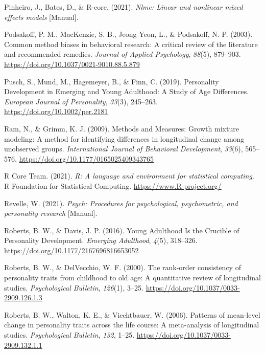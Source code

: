 \documentclass[
  english,
  man,floatsintext]{apa7}
\begin{document}
\leavevmode\hypertarget{ref-R-nlme}{}%
Pinheiro, J., Bates, D., \& R-core. (2021). \emph{Nlme: Linear and nonlinear mixed effects models} {[}Manual{]}.

\leavevmode\hypertarget{ref-podsakoffCommonMethodBiases2003}{}%
Podsakoff, P. M., MacKenzie, S. B., Jeong-Yeon, L., \& Podsakoff, N. P. (2003). Common method biases in behavioral research: A critical review of the literature and recommended remedies. \emph{Journal of Applied Psychology}, \emph{88}(5), 879--903. \url{https://doi.org/10.1037/0021-9010.88.5.879}

\leavevmode\hypertarget{ref-puschPersonalityDevelopmentEmerging2019}{}%
Pusch, S., Mund, M., Hagemeyer, B., \& Finn, C. (2019). Personality Development in Emerging and Young Adulthood: A Study of Age Differences. \emph{European Journal of Personality}, \emph{33}(3), 245--263. \url{https://doi.org/10.1002/per.2181}

\leavevmode\hypertarget{ref-ramMethodsMeasuresGrowth2009}{}%
Ram, N., \& Grimm, K. J. (2009). Methods and Measures: Growth mixture modeling: A method for identifying differences in longitudinal change among unobserved groups. \emph{International Journal of Behavioral Development}, \emph{33}(6), 565--576. \url{https://doi.org/10.1177/0165025409343765}

\leavevmode\hypertarget{ref-R-base}{}%
R Core Team. (2021). \emph{R: A language and environment for statistical computing}. R Foundation for Statistical Computing. \url{https://www.R-project.org/}

\leavevmode\hypertarget{ref-R-psych}{}%
Revelle, W. (2021). \emph{Psych: Procedures for psychological, psychometric, and personality research} {[}Manual{]}.

\leavevmode\hypertarget{ref-robertsYoungAdulthoodCrucible2016}{}%
Roberts, B. W., \& Davis, J. P. (2016). Young Adulthood Is the Crucible of Personality Development. \emph{Emerging Adulthood}, \emph{4}(5), 318--326. \url{https://doi.org/10.1177/2167696816653052}

\leavevmode\hypertarget{ref-robertsRankorderConsistencyPersonality2000}{}%
Roberts, B. W., \& DelVecchio, W. F. (2000). The rank-order consistency of personality traits from childhood to old age: A quantitative review of longitudinal studies. \emph{Psychological Bulletin}, \emph{126}(1), 3--25. \url{https://doi.org/10.1037/0033-2909.126.1.3}

\leavevmode\hypertarget{ref-robertsPatternsMeanlevelChange2006a}{}%
Roberts, B. W., Walton, K. E., \& Viechtbauer, W. (2006). Patterns of mean-level change in personality traits across the life course: A meta-analysis of longitudinal studies. \emph{Psychological Bulletin}, \emph{132}, 1--25. \url{https://doi.org/10.1037/0033-2909.132.1.1}
\end{document}
